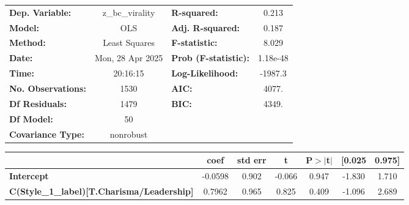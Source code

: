 \begin{center}
\begin{tabular}{lclc}
\toprule
\textbf{Dep. Variable:}                                                              & z\_bc\_virality  & \textbf{  R-squared:         } &     0.213   \\
\textbf{Model:}                                                                      &       OLS        & \textbf{  Adj. R-squared:    } &     0.187   \\
\textbf{Method:}                                                                     &  Least Squares   & \textbf{  F-statistic:       } &     8.029   \\
\textbf{Date:}                                                                       & Mon, 28 Apr 2025 & \textbf{  Prob (F-statistic):} &  1.18e-48   \\
\textbf{Time:}                                                                       &     20:16:15     & \textbf{  Log-Likelihood:    } &   -1987.3   \\
\textbf{No. Observations:}                                                           &        1530      & \textbf{  AIC:               } &     4077.   \\
\textbf{Df Residuals:}                                                               &        1479      & \textbf{  BIC:               } &     4349.   \\
\textbf{Df Model:}                                                                   &          50      & \textbf{                     } &             \\
\textbf{Covariance Type:}                                                            &    nonrobust     & \textbf{                     } &             \\
\bottomrule
\end{tabular}
\begin{tabular}{lcccccc}
                                                                                     & \textbf{coef} & \textbf{std err} & \textbf{t} & \textbf{P$> |$t$|$} & \textbf{[0.025} & \textbf{0.975]}  \\
\midrule
\textbf{Intercept}                                                                   &      -0.0598  &        0.902     &    -0.066  &         0.947        &       -1.830    &        1.710     \\
\textbf{C(Style\_1\_label)[T.Charisma/Leadership]}                                   &       0.7962  &        0.965     &     0.825  &         0.409        &       -1.096    &        2.689     \\

\end{tabular}
\end{center}
